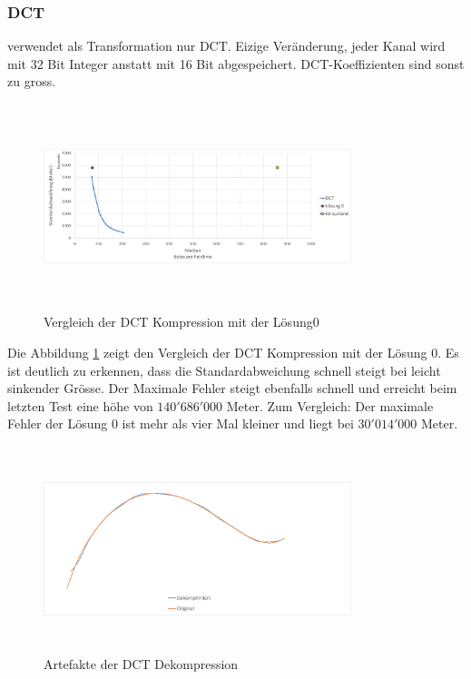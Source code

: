\subsubsection{DCT}\label{resultate:dct}
verwendet als Transformation nur DCT. Eizige Veränderung, jeder Kanal wird mit 32 Bit Integer anstatt mit 16 Bit abgespeichert. DCT-Koeffizienten sind sonst zu gross.
\begin{figure}[!htbp]
	\center
	\includegraphics[width=0.8\textwidth,height=6cm,keepaspectratio]{./pictures/resultate/loesung1/loesung1-0/loesung1_0.png}
	\caption{Vergleich der DCT Kompression mit der Lösung0}
	\label{resultate:loesung1:dct:resultate}
\end{figure}
Die Abbildung \ref{resultate:loesung1:dct:resultate} zeigt den Vergleich der DCT Kompression mit der Lösung 0. Es ist deutlich zu erkennen, dass die Standardabweichung schnell steigt bei leicht sinkender Grösse. Der Maximale Fehler steigt ebenfalls schnell und erreicht beim letzten Test eine höhe von $140'686'000$ Meter. Zum Vergleich: Der maximale Fehler der Lösung 0 ist mehr als vier Mal kleiner und liegt bei $30'014'000$ Meter.\\
\begin{figure}[!htbp]
	\center
	\includegraphics[width=0.8\textwidth,height=6cm,keepaspectratio]{./pictures/resultate/loesung1/loesung1-0/loesung1_0_artefakte.png}
	\caption{Artefakte der DCT Dekompression}
	\label{resultate:loesung1:dct:artefakte}
\end{figure}
